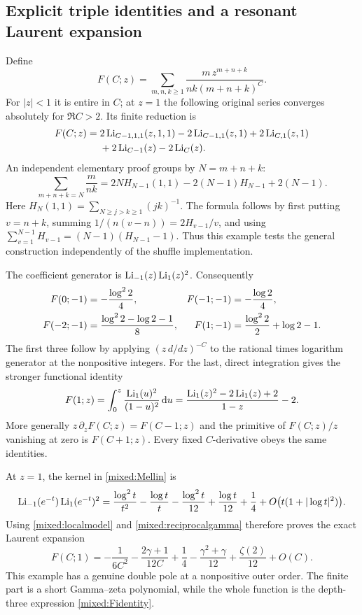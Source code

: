 \subsection{Explicit triple identities and a resonant Laurent expansion}

Define
\begin{equation}\label{mixed:F}
 F(C;z)=\sum_{m,n,k\ge1}\frac{m\,z^{m+n+k}}{nk(m+n+k)^C}.
\end{equation}
For $|z|<1$ it is entire in $C$; at $z=1$ the following original
series converges absolutely for $\Re C>2$. Its finite reduction is
\begin{align}\label{mixed:Fidentity}
 F(C;z)={}&2\operatorname{Li}_{C-1,1,1}(z,1,1)
          -2\operatorname{Li}_{C-1,1}(z,1)+2\operatorname{Li}_{C,1}(z,1)\notag\\
         &+2\operatorname{Li}_{C-1}(z)-2\operatorname{Li}_C(z).
\end{align}
An independent elementary proof groups by $N=m+n+k$:
\[
 \sum_{m+n+k=N}\frac m{nk}
 =2N H_{N-1}(1,1)-2(N-1)H_{N-1}+2(N-1).
\]
Here $H_N(1,1)=\sum_{N\ge j>k\ge1}(jk)^{-1}$.
The formula follows by first putting $v=n+k$, summing
$1/(n(v-n))=2H_{v-1}/v$, and using
$\sum_{v=1}^{N-1}H_{v-1}=(N-1)(H_{N-1}-1)$.
Thus this example tests the general construction independently of
the shuffle implementation.

The coefficient generator is
$\operatorname{Li}_{-1}(z)\operatorname{Li}_1(z)^2$. Consequently
\begin{align}\label{mixed:Fvalues}
 F(0;-1)&=-\frac{\log^2 2}{4},&
 F(-1;-1)&=-\frac{\log2}{4},\notag\\
 F(-2;-1)&=\frac{\log^2 2-\log2-1}{8},&
 F(1;-1)&=\frac{\log^2 2}{2}+\log2-1.
\end{align}
The first three follow by applying $(z\,d/dz)^{-C}$ to the rational
times logarithm generator at the nonpositive integers. For the last,
direct integration gives the stronger functional identity
\begin{equation}\label{mixed:Fprimitive}
 F(1;z)=\int_0^z\frac{\operatorname{Li}_1(u)^2}{(1-u)^2}\,\mathrm d u
       =\frac{\operatorname{Li}_1(z)^2-2\operatorname{Li}_1(z)+2}{1-z}-2.
\end{equation}
More generally $z\,\partial_z F(C;z)=F(C-1;z)$ and the primitive
of $F(C;z)/z$ vanishing at zero is $F(C+1;z)$. Every fixed
$C$-derivative obeys the same identities.

At $z=1$, the kernel in \eqref{mixed:Mellin} is
\[
 \operatorname{Li}_{-1}(e^{-t})\operatorname{Li}_1(e^{-t})^2
 =\frac{\log^2t}{t^2}-\frac{\log t}{t}
    -\frac{\log^2t}{12}+\frac{\log t}{12}+\frac14
       +O\bigl(t(1+|\log t|^2)\bigr).
\]
Using \eqref{mixed:localmodel} and \eqref{mixed:reciprocalgamma}
therefore proves the exact Laurent expansion
\begin{equation}\label{mixed:Flaurent}
 \boxed{\displaystyle
 F(C;1)=-\frac1{6C^2}-\frac{2\gamma+1}{12C}
       +\frac14-\frac{\gamma^2+\gamma}{12}
                +\frac{\zeta(2)}{12}+O(C).}
\end{equation}
This example has a genuine double pole at a nonpositive outer order.
The finite part is a short Gamma--zeta polynomial, while the whole
function is the depth-three expression \eqref{mixed:Fidentity}.


